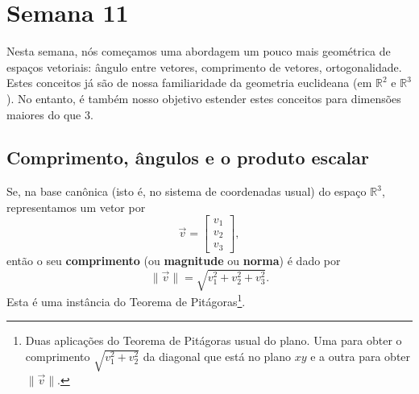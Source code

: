 

\providecommand{\dir}{..}


%

\chapter{Semana 11}


Nesta semana, nós começamos uma abordagem um pouco mais geométrica de espaços vetoriais: ângulo entre vetores, comprimento de vetores, ortogonalidade. Estes conceitos já são de nossa familiaridade da geometria euclideana (em $\mathbb{R}^2$ e $\mathbb{R}^3$). No entanto, é também nosso objetivo estender estes conceitos para dimensões maiores do que $3$.


\section{Comprimento, ângulos e o produto escalar}

Se, na base canônica (isto é, no sistema de coordenadas usual) do espaço $\mathbb{R}^3$, representamos um vetor por
\begin{equation}
\vec{v} =
\begin{bmatrix}
v_1 \\ v_2 \\ v_3
\end{bmatrix},
\end{equation} então o seu \textbf{comprimento} (ou \textbf{magnitude} ou \textbf{norma}) é dado por
\begin{equation}
\|\vec{v}\| = \sqrt{v_1^2 + v_2^2 + v_3^2}.
\end{equation} Esta é uma instância do Teorema de Pitágoras\footnote{Duas aplicações do Teorema de Pitágoras usual do plano. Uma para obter o comprimento $\sqrt{v_1^2 + v_2^2}$ da diagonal que está no plano $xy$ e a outra para obter $\|\vec{v}\|$.}.

